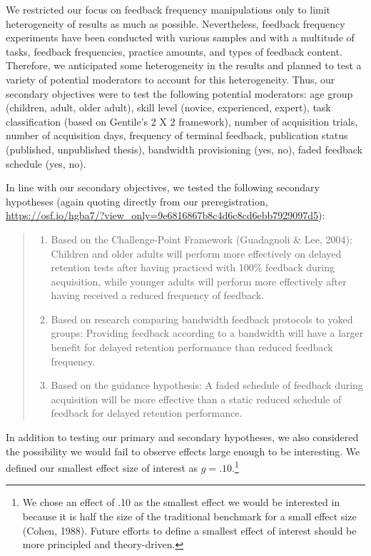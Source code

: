 \documentclass[
  english,
  man, donotrepeattitle,mask,floatsintext]{apa7}
\providecommand{\tightlist}{%
  \setlength{\itemsep}{0pt}\setlength{\parskip}{0pt}}
\begin{document}
We restricted our focus on feedback frequency manipulations only to limit heterogeneity of results as much as possible. Nevertheless, feedback frequency experiments have been conducted with various samples and with a multitude of tasks, feedback frequencies, practice amounts, and types of feedback content. Therefore, we anticipated some heterogeneity in the results and planned to test a variety of potential moderators to account for this heterogeneity. Thus, our secondary objectives were to test the following potential moderators: age group (children, adult, older adult), skill level (novice, experienced, expert), task classification (based on Gentile's 2 X 2 framework), number of acquisition trials, number of acquisition days, frequency of terminal feedback, publication status (published, unpublished thesis), bandwidth provisioning (yes, no), faded feedback schedule (yes, no).

In line with our secondary objectives, we tested the following secondary hypotheses (again quoting directly from our preregistration, \url{https://osf.io/hgba7/?view_only=9e6816867b8c4d6c8cd6ebb7929097d5}):

\begin{quote}
\begin{enumerate}
\def\labelenumi{\arabic{enumi})}
\tightlist
\item
  Based on the Challenge-Point Framework (Guadagnoli \& Lee, 2004): Children and older adults will perform more effectively on delayed retention tests after having practiced with 100\% feedback during acquisition, while younger adults will perform more effectively after having received a reduced frequency of feedback.
\item
  Based on research comparing bandwidth feedback protocols to yoked groups: Providing feedback according to a bandwidth will have a larger benefit for delayed retention performance than reduced feedback frequency.
\item
  Based on the guidance hypothesis: A faded schedule of feedback during acquisition will be more effective than a static reduced schedule of feedback for delayed retention performance.
\end{enumerate}
\end{quote}

In addition to testing our primary and secondary hypotheses, we also considered the possibility we would fail to observe effects large enough to be interesting. We defined our smallest effect size of interest as \(g = .10\).\footnote{We chose an effect of .10 as the smallest effect we would be interested in because it is half the size of the traditional benchmark for a small effect size (Cohen, 1988). Future efforts to define a smallest effect of interest should be more principled and theory-driven.}
\end{document}

